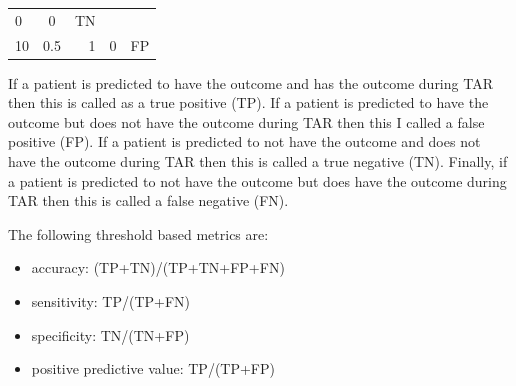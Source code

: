 \documentclass[11pt]{book}
\providecommand{\tightlist}{%
  \setlength{\itemsep}{0pt}\setlength{\parskip}{0pt}}
\begin{document}
\begin{longtable}[]{@{}lcrrr@{}}
\begin{minipage}[t]{0.10\columnwidth}
0\strut
\end{minipage} & \begin{minipage}[t]{0.10\columnwidth}\raggedleft\strut
0\strut
\end{minipage} & \begin{minipage}[t]{0.10\columnwidth}\raggedleft\strut
TN\strut
\end{minipage}\tabularnewline
\begin{minipage}[t]{0.19\columnwidth}\raggedright\strut
10\strut
\end{minipage} & \begin{minipage}[t]{0.19\columnwidth}\centering\strut
0.5\strut
\end{minipage} & \begin{minipage}[t]{0.10\columnwidth}\raggedleft\strut
1\strut
\end{minipage} & \begin{minipage}[t]{0.10\columnwidth}\raggedleft\strut
0\strut
\end{minipage} & \begin{minipage}[t]{0.10\columnwidth}\raggedleft\strut
FP\strut
\end{minipage}\tabularnewline
\bottomrule
\end{longtable}

If a patient is predicted to have the outcome and has the outcome during
TAR then this is called as a true positive (TP). If a patient is
predicted to have the outcome but does not have the outcome during TAR
then this I called a false positive (FP). If a patient is predicted to
not have the outcome and does not have the outcome during TAR then this
is called a true negative (TN). Finally, if a patient is predicted to
not have the outcome but does have the outcome during TAR then this is
called a false negative (FN).

The following threshold based metrics are:

\begin{itemize}
\tightlist
\item
  accuracy: (TP+TN)/(TP+TN+FP+FN)
\item
  sensitivity: TP/(TP+FN)
\item
  specificity: TN/(TN+FP)
\item
  positive predictive value: TP/(TP+FP)
\end{itemize}
\end{document}
